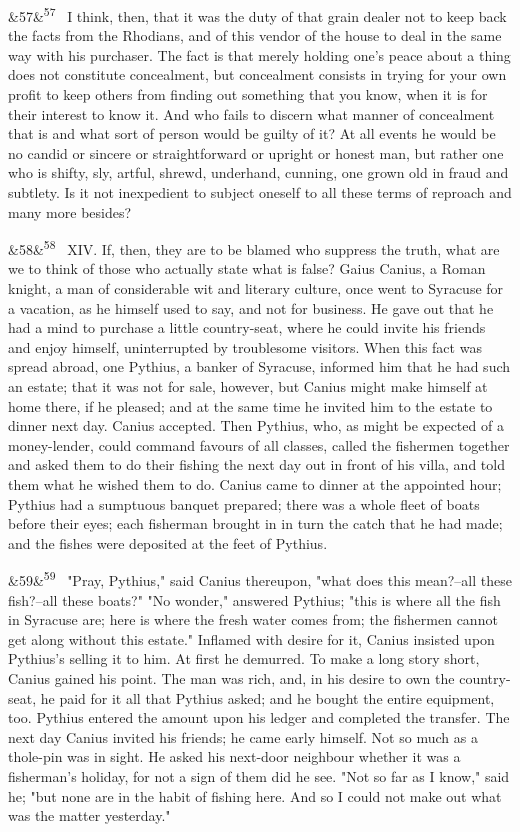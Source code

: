 \documentclass[12pt]{article}
\newcommand{\para}[1][]{\par\noindent\ifx&#1&\else\textsuperscript{\footnotesize #1}~\fi}
\begin{document}
\para[57] I think, then, that it was the duty of that grain dealer not to keep back the facts from the Rhodians, and of this vendor of the house to deal in the same way with his purchaser. The fact is that merely holding one's peace about a thing does not constitute concealment, but concealment consists in trying for your own profit to keep others from finding out something that you know, when it is for their interest to know it. And who fails to discern what manner of concealment that is and what sort of person would be guilty of it? At all events he would be no candid or sincere or straightforward or upright or honest man, but rather one who is shifty, sly, artful, shrewd, underhand, cunning, one grown old in fraud and subtlety. Is it not inexpedient to subject oneself to all these terms of reproach and many more besides?

\para[58] XIV. If, then, they are to be blamed who suppress the truth, what are we to think of those who actually state what is false? Gaius Canius, a Roman knight, a man of considerable wit and literary culture, once went to Syracuse for a vacation, as he himself used to say, and not for business. He gave out that he had a mind to purchase a little country-seat, where he could invite his friends and enjoy himself, uninterrupted by troublesome visitors. When this fact was spread abroad, one Pythius, a banker of Syracuse, informed him that he had such an estate; that it was not for sale, however, but Canius might make himself at home there, if he pleased; and at the same time he invited him to the estate to dinner next day. Canius accepted. Then Pythius, who, as might be expected of a money-lender, could command favours of all classes, called the fishermen together and asked them to do their fishing the next day out in front of his villa, and told them what he wished them to do. Canius came to dinner at the appointed hour; Pythius had a sumptuous banquet prepared; there was a whole fleet of boats before their eyes; each fisherman brought in in turn the catch that he had made; and the fishes were deposited at the feet of Pythius.

\para[59] "Pray, Pythius," said Canius thereupon, "what does this mean?--all these fish?--all these boats?" "No wonder," answered Pythius; "this is where all the fish in Syracuse are; here is where the fresh water comes from; the fishermen cannot get along without this estate." Inflamed with desire for it, Canius insisted upon Pythius's selling it to him. At first he demurred. To make a long story short, Canius gained his point. The man was rich, and, in his desire to own the country-seat, he paid for it all that Pythius asked; and he bought the entire equipment, too. Pythius entered the amount upon his ledger and completed the transfer. The next day Canius invited his friends; he came early himself. Not so much as a thole-pin was in sight. He asked his next-door neighbour whether it was a fisherman's holiday, for not a sign of them did he see. "Not so far as I know," said he; "but none are in the habit of fishing here. And so I could not make out what was the matter yesterday."
\end{document}
